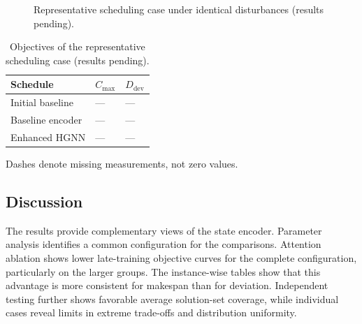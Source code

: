 \begin{figure}[t]
\centering
{}
\caption{Representative scheduling case under identical disturbances (results pending).}
\label{fig:gantt_pending}
\end{figure}

\begin{table}[t]
\centering
\caption{Objectives of the representative scheduling case (results pending).}
\label{tab:case_pending}
\footnotesize
\setlength{\tabcolsep}{3pt}
\begin{tabular*}{\linewidth}{@{\extracolsep{\fill}}lll@{}}
\toprule
Schedule & $C_{\max}$ & $D_{\mathrm{dev}}$ \\
\midrule
Initial baseline & --- & --- \\
Baseline encoder & --- & --- \\
Enhanced HGNN & --- & --- \\
\bottomrule
\end{tabular*}
\par\smallskip
{\footnotesize Dashes denote missing measurements, not zero values.}
\end{table}

\subsection{Discussion}
\label{subsec:experimental_discussion}

The results provide complementary views of the state encoder. Parameter analysis identifies a common
configuration for the comparisons. Attention ablation shows lower late-training objective curves
for the complete configuration, particularly on the larger groups. The instance-wise tables show
that this advantage is more consistent for makespan than for deviation. Independent testing further
shows favorable average solution-set coverage, while individual cases reveal limits in extreme trade-offs
and distribution uniformity.

